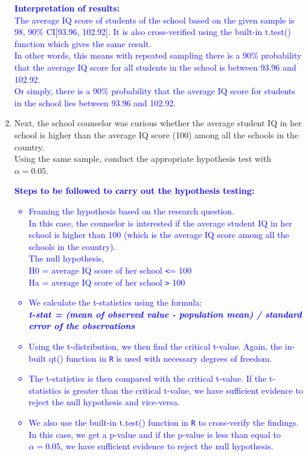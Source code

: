 \documentclass[12pt,letterpaper]{article}
\begin{document}
\begin{enumerate}
\textcolor{blue}{
	\textbf{Interpretation of results:}\\
	The average IQ score of students of the school based on the given sample is\\ 98, 90\% CI[93.96, 102.92]. It is also cross-verified using the built-in t.test() function which gives the same result.
	\vspace*{0.25cm}\\
	In other words, this means with repeated sampling there is a 90\% probability that the average IQ score for all students in the school is between 93.96 and 102.92.\\
	Or simply, there is a 90\% probability that the average IQ score for students in the school lies between 93.96 and 102.92.
	}

\vspace*{0.5cm}

	\item Next, the school counselor was curious  whether  the average student IQ in her school is higher than the average IQ score (100) among all the schools in the country.\\ 
	
	\noindent Using the same sample, conduct the appropriate hypothesis test with $\alpha=0.05$.\\

\textcolor{blue}{
	\textbf{Steps to be followed to carry out the hypothesis testing:}
	\begin{itemize}
		\item Framing the hypothesis based on the research question.\\
		In this case, the counselor is interested if the average student IQ in her school is higher than 100 (which is the average IQ score among all the schools in the country).\\
		The null hypothesis,\\
		H0 = average IQ score of her school \texttt{<}= 100\\
		Ha = average IQ score of her school \texttt{>} 100\\
		\item We calculate the t-statistics using the formula:
		\vspace*{0.25cm}\\
		\textbf{\textit{t-stat = (mean of observed value - population mean) / standard error of the observations}}
		\item Using the t-distribution, we then find the critical t-value. Again, the in-built qt() function in \texttt{R} is used with necessary degrees of freedom.
		\item The t-statistics is then compared with the critical t-value. If the t-statistics is greater than the critical t-value, we have sufficient evidence to reject the null hypothesis and vice-versa.
		\item We also use the built-in t.test() function in \texttt{R} to cross-verify the findings.\\
		In this case, we get a p-value and if the p-value is less than equal to $\alpha=0.05$, we have sufficient evidence to reject the null hypothesis.
	\end{itemize}
	}


\end{enumerate}
\end{document}
